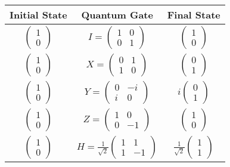\documentclass[onecolumn,10pt,cleanfoot]{asme2ej}
\begin{document}
\begin{center}
\renewcommand{\arraystretch}{1.5}
\begin{tabular}{|c|c|c|}
\hline
Initial State & Quantum Gate & Final State \\
\hline
$\begin{pmatrix} 1 \\ 0 \end{pmatrix}$ & $I = \begin{pmatrix} 1 & 0 \\ 0 & 1 \end{pmatrix}$ & $\begin{pmatrix} 1 \\ 0 \end{pmatrix}$ \\
\hline
$\begin{pmatrix} 1 \\ 0 \end{pmatrix}$ & $X = \begin{pmatrix} 0 & 1 \\ 1 & 0 \end{pmatrix}$ & $\begin{pmatrix} 0 \\ 1 \end{pmatrix}$ \\
\hline
$\begin{pmatrix} 1 \\ 0 \end{pmatrix}$ & $Y = \begin{pmatrix} 0 & -i \\ i & 0 \end{pmatrix}$ & $i\begin{pmatrix} 0 \\ 1 \end{pmatrix}$ \\
\hline
$\begin{pmatrix} 1 \\ 0 \end{pmatrix}$ & $Z = \begin{pmatrix} 1 & 0 \\ 0 & -1 \end{pmatrix}$ & $\begin{pmatrix} 1 \\ 0 \end{pmatrix}$ \\
\hline
$\begin{pmatrix} 1 \\ 0 \end{pmatrix}$ & $H = \frac{1}{\sqrt{2}}\begin{pmatrix} 1 & 1 \\ 1 & -1 \end{pmatrix}$ & $\frac{1}{\sqrt{2}}\begin{pmatrix} 1 \\ 1 \end{pmatrix}$ \\

\end{tabular}
\end{center}
\end{document}
